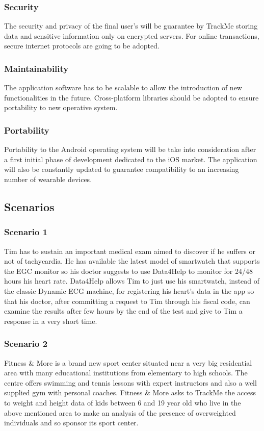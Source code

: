 \documentclass{article}
\begin{document}
	\subsubsection{Security}
	The security and privacy of the final user's will be guarantee by 
	TrackMe storing data and sensitive information only on encrypted 
	servers. \newline
	For online transactions, secure internet protocols are going to
	be adopted. 
	
	\subsubsection{Maintainability}
	The application software has to be scalable to allow the
	introduction of new functionalities in the future. 
	Cross-platform libraries should be adopted to ensure portability 
	to new operative system. 
	
	\subsubsection{Portability}
	Portability to the Android operating system will be take into 
	consideration after a first initial phase of development dedicated
	to the iOS market. \newline
	The application will also be constantly updated to guarantee 
	compatibility to an increasing number of wearable devices. 
	
\newpage
\subsection{Scenarios}

	\subsubsection{Scenario 1}
	Tim has to sustain an important medical exam aimed to discover if 
	he suffers or not of tachycardia. He has available the latest 
	model of smartwatch that supports the EGC monitor so his doctor 
	suggests to use Data4Help to monitor for 24/48 hours his heart 
	rate. Data4Help allows Tim to just use his smartwatch, instead of 
	the classic Dynamic ECG machine, for registering his heart’s data 
	in the app so that his doctor, after committing a request to Tim 
	through his fiscal code, can examine the results after few hours 
	by the end of the test and give to Tim a response in a very short 
	time. 

	\subsubsection{Scenario 2}
	Fitness \& More is a brand new sport center situated near a very
	big residential area with many educational institutions from 
	elementary to high schools. The centre offers swimming and tennis
	lessons with expert instructors and also a well supplied gym with
	personal coaches. \newline
	Fitness \& More asks to TrackMe the access to weight and height 
	data of kids between 6 and 19 year old who live in the above 
	mentioned area to make an analysis of the presence of overweighted
	individuals and so sponsor its sport center. 
	
\end{document}
